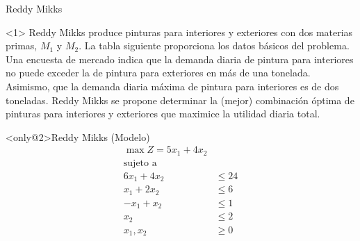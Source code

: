 \begin{frameExample}{Reddy Mikks  }

  \label{example:reddy-mikks}
  \begin{onlyenv}<1>
    Reddy Mikks produce pinturas para interiores y exteriores con dos materias primas, $M_1$ y $M_2$. La tabla siguiente proporciona los datos básicos del problema. Una encuesta de mercado indica que la demanda diaria de pintura para interiores no puede exceder la de pintura para exteriores en más de una tonelada. Asimismo, que la demanda diaria máxima de pintura para interiores es de dos toneladas. Reddy Mikks se propone determinar la (mejor) combinación óptima de pinturas para interiores y exteriores que maximice la utilidad diaria total.%

    {\centering
      \par}
  \end{onlyenv}
  
\begin{block}<only@2>{Reddy Mikks (Modelo) }\justifying
    \begin{align*}
      \max Z = 5x_1 + 4x_2 & \\[3mm]
      \text{sujeto a } & \\[2mm]
    6x_1 + 4x_2 & \leq 24\\
    x_1 + 2x_2 & \leq 6\\
    -x_1 + x_2 & \leq 1\\
    x_2 & \leq 2\\[5mm]
    x_1, x_2 & \geq 0
  \end{align*}
\end{block}
\end{frameExample}




